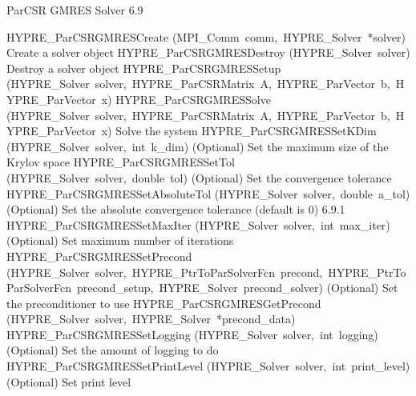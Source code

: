 \documentclass{article}
\begin{document}
\begin{cxxentry}
\begin{cxxentry}
\begin{cxxfunction}
\begin{cxxdoc}
\end{cxxdoc}
\end{cxxfunction}
\end{cxxentry}
\begin{cxxentry}
{}
        {ParCSR GMRES Solver}
        {}
        {
}
        {6.9}
\begin{cxxnames}
        {HYPRE\_ParCSRGMRESCreate}
        {(MPI\_Comm\ comm,\ HYPRE\_Solver\ *solver)}
        {
Create a solver object}
        {}
\label{cxx.6.9.2}
        {HYPRE\_ParCSRGMRESDestroy}
        {(HYPRE\_Solver\ solver)}
        {
Destroy a solver object}
        {}
\label{cxx.6.9.3}
        {HYPRE\_ParCSRGMRESSetup}
        {(HYPRE\_Solver\ solver,\ HYPRE\_ParCSRMatrix\ A,\ HYPRE\_ParVector\ b,\ HYPRE\_ParVector\ x)}
        {}
        {}
\label{cxx.6.9.4}
        {HYPRE\_ParCSRGMRESSolve}
        {(HYPRE\_Solver\ solver,\ HYPRE\_ParCSRMatrix\ A,\ HYPRE\_ParVector\ b,\ HYPRE\_ParVector\ x)}
        {
Solve the system}
        {}
\label{cxx.6.9.5}
        {HYPRE\_ParCSRGMRESSetKDim}
        {(HYPRE\_Solver\ solver,\ int\ k\_dim)}
        {
(Optional) Set the maximum size of the Krylov space}
        {}
\label{cxx.6.9.6}
        {HYPRE\_ParCSRGMRESSetTol}
        {(HYPRE\_Solver\ solver,\ double\ tol)}
        {
(Optional) Set the convergence tolerance}
        {}
\label{cxx.6.9.7}
        {HYPRE\_ParCSRGMRESSetAbsoluteTol}
        {(HYPRE\_Solver\ solver,\ double\ a\_tol)}
        {
(Optional) Set the absolute convergence tolerance (default is 0)}
        {6.9.1}
        {HYPRE\_ParCSRGMRESSetMaxIter}
        {(HYPRE\_Solver\ solver,\ int\ max\_iter)}
        {
(Optional) Set maximum number of iterations}
        {}
\label{cxx.6.9.8}
        {HYPRE\_ParCSRGMRESSetPrecond}
        {(HYPRE\_Solver\ solver,\ HYPRE\_PtrToParSolverFcn\ precond,\ HYPRE\_PtrToParSolverFcn\ precond\_setup,\ HYPRE\_Solver\ precond\_solver)}
        {
(Optional) Set the preconditioner to use}
        {}
\label{cxx.6.9.9}
        {HYPRE\_ParCSRGMRESGetPrecond}
        {(HYPRE\_Solver\ solver,\ HYPRE\_Solver\ *precond\_data)}
        {}
        {}
\label{cxx.6.9.10}
        {HYPRE\_ParCSRGMRESSetLogging}
        {(HYPRE\_Solver\ solver,\ int\ logging)}
        {
(Optional) Set the amount of logging to do}
        {}
\label{cxx.6.9.11}
        {HYPRE\_ParCSRGMRESSetPrintLevel}
        {(HYPRE\_Solver\ solver,\ int\ print\_level)}
        {
(Optional) Set print level}

\end{cxxnames}
\end{cxxentry}
\end{cxxentry}
\end{document}
